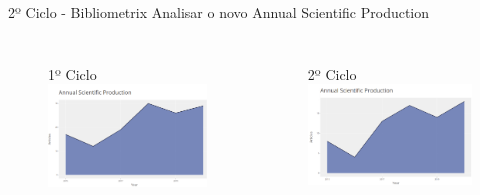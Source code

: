 \begin{frame}{2º Ciclo - Bibliometrix}
	Analisar o novo Annual Scientific Production
	\begin{columns}
		\centering
		\begin{figure}[hb]
      		1º Ciclo
			\includegraphics[width=1\textwidth]{figures/anualold.png}
		\end{figure}
		\begin{figure}[ht]
      	2º Ciclo
      \includegraphics[width=1\textwidth]{figures/anualnovo.png}
		\end{figure}
	\end{columns}
\end{frame}

